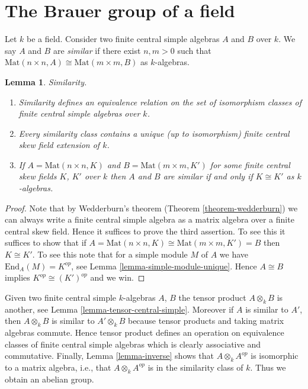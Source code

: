 \documentclass{stacks-project}
\theoremstyle{plain}
\newtheorem{lemma}[subsection]{Lemma}
\theoremstyle{definition}
\theoremstyle{remark}
\numberwithin{equation}{subsection}
\begin{document}
\section{The Brauer group of a field}
\label{section-brauer}

\noindent
Let $k$ be a field. Consider two finite central simple algebras
$A$ and $B$ over $k$. We say $A$ and $B$ are {\it similar} if there
exist $n, m > 0$ such that
$\text{Mat}(n \times n, A) \cong \text{Mat}(m \times m, B)$
as $k$-algebras.

\begin{lemma}
\label{lemma-similar}
Similarity.
\begin{enumerate}
\item Similarity defines an equivalence relation on the set of isomorphism
classes of finite central simple algebras over $k$.
\item Every similarity class contains a unique (up to isomorphism)
finite central skew field extension of $k$.
\item If $A = \text{Mat}(n \times n, K)$ and $B = \text{Mat}(m \times m, K')$
for some finite central skew fields $K$, $K'$ over $k$
then $A$ and $B$ are similar if and only if $K \cong K'$ as $k$-algebras.
\end{enumerate}
\end{lemma}

\begin{proof}
Note that by Wedderburn's theorem (Theorem \ref{theorem-wedderburn})
we can always write a finite central simple algebra as a matrix
algebra over a finite central skew field. Hence it suffices to prove
the third assertion. To see this it suffices to show that if
$A = \text{Mat}(n \times n, K) \cong \text{Mat}(m \times m, K') = B$
then $K \cong K'$. To see this note that for a simple module $M$ of $A$
we have $\text{End}_A(M) = K^{op}$, see
Lemma \ref{lemma-simple-module-unique}.
Hence $A \cong B$ implies $K^{op} \cong (K')^{op}$ and we win.
\end{proof}

\noindent
Given two finite central simple $k$-algebras $A$, $B$ the tensor
product $A \otimes_k B$ is another, see
Lemma \ref{lemma-tensor-central-simple}.
Moreover if $A$ is similar to $A'$, then $A \otimes_k B$ is similar
to $A' \otimes_k B$ because tensor products and taking matrix
algebras commute. Hence tensor product defines an operation on
equivalence classes of finite central simple algebras which is clearly
associative and commutative. Finally,
Lemma \ref{lemma-inverse}
shows that $A \otimes_k A^{op}$ is isomorphic to a matrix algebra, i.e.,
that $A \otimes_k A^{op}$ is in the similarity class of $k$.
Thus we obtain an abelian group.
\end{document}
